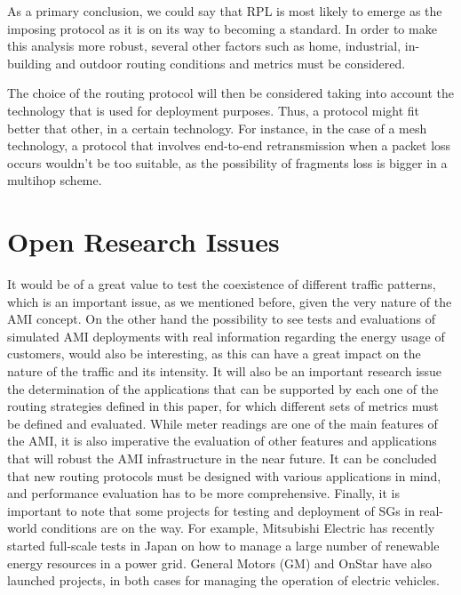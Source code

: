 \documentclass[11pt,final,onecolumn]{IEEEtran}
\begin{document}
As a primary conclusion, we could say that RPL is most likely to emerge as the imposing protocol as it is on its way to becoming a standard. In order to make this analysis more robust, several other factors such as home, industrial, in-building and outdoor routing conditions and metrics must be considered.

The choice of the routing protocol will then be considered taking into account the technology that is used for deployment purposes. Thus, a protocol might fit better that other, in a certain technology. For instance, in the case of a mesh technology, a protocol that involves end-to-end retransmission when a packet loss occurs wouldn’t be too suitable, as the possibility of fragments loss is bigger in a multihop scheme.



\section{Open Research Issues}\label{issues}
It would be of a great value to test the coexistence of different traffic patterns, which is an important issue, as we mentioned before, given the very nature of the AMI concept. On the other hand the possibility to see tests and evaluations of simulated AMI deployments with real information regarding the energy usage of customers, would also be interesting, as this can have a great impact on the nature of the traffic and its intensity. It will also be an important research issue the determination of the applications that can be supported by each one of the routing strategies defined in this paper, for which different sets of metrics must be defined and evaluated. While meter readings are one of the main features of the AMI, it is also imperative the evaluation of other features and applications that will robust the AMI infrastructure in the near future. It can be concluded that new routing protocols must be designed with various applications in mind, and performance evaluation has to be more comprehensive. Finally, it is important to note that some projects for testing and deployment of SGs in real-world conditions are on the way. For example, Mitsubishi Electric has recently started full-scale tests in Japan on how to manage a large number of renewable energy resources in a power grid. General Motors (GM) and OnStar have also launched projects, in both cases for managing the operation of electric vehicles.


%
%
%
%
%
\end{document}
